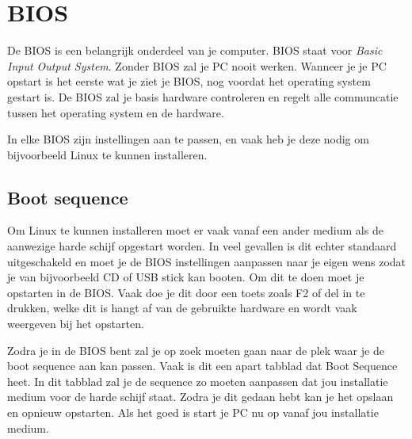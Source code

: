 %
%
%
%

\chapter{BIOS}
De BIOS is een belangrijk onderdeel van je computer. BIOS staat voor \emph{Basic Input Output System}. Zonder BIOS zal je PC nooit werken. Wanneer je je PC opstart is het eerste wat je ziet je BIOS, nog voordat het operating system gestart is. De BIOS zal je basis hardware controleren en regelt alle communcatie tussen het operating system en de hardware. 

In elke BIOS zijn instellingen aan te passen, en vaak heb je deze nodig om bijvoorbeeld Linux te kunnen installeren. 

\section{Boot sequence}
Om Linux te kunnen installeren moet er vaak vanaf een ander medium als de aanwezige harde schijf opgestart worden. In veel gevallen is dit echter standaard uitgeschakeld en moet je de BIOS instellingen aanpassen naar je eigen wens zodat je van bijvoorbeeld CD of USB stick kan booten.
Om dit te doen moet je opstarten in de BIOS. Vaak doe je dit door een toets zoals F2 of del in te drukken, welke dit is hangt af van de gebruikte hardware en wordt vaak weergeven bij het opstarten.

Zodra je in de BIOS bent zal je op zoek moeten gaan naar de plek waar je de boot sequence aan kan passen. Vaak is dit een apart tabblad dat Boot Sequence heet. In dit tabblad zal je de sequence zo moeten aanpassen dat jou installatie medium voor de harde schijf staat. Zodra je dit gedaan hebt kan je het opslaan en opnieuw opstarten. Als het goed is start je PC nu op vanaf jou installatie medium.
